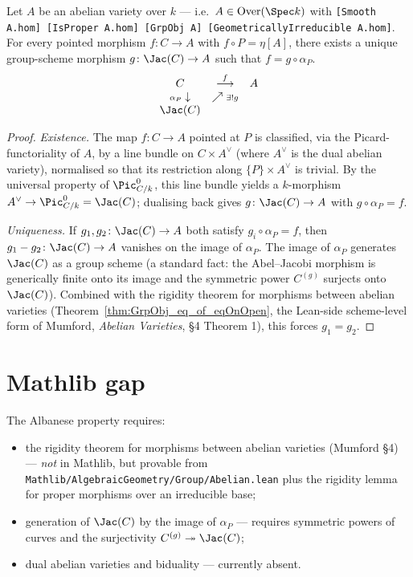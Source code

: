 \begin{theorem}
  \label{thm:exists_unique_ofCurve_comp}
  \leanok
  Let $A$ be an abelian variety over $k$ — i.e.\ $A \in \textrm{Over}(\Spec k)$ with \lstinline{[Smooth A.hom] [IsProper A.hom] [GrpObj A] [GeometricallyIrreducible A.hom]}. For every pointed morphism $f\colon C \to A$ with $f \circ P = \eta[A]$, there exists a unique group-scheme morphism $g\colon \Jac(C) \to A$ such that $f = g \circ \alpha_P$.
  \[
  \begin{array}{ccc}
    C & \stackrel{f}{\longrightarrow} & A \\
    {\scriptstyle\alpha_P} \downarrow & \nearrow {\scriptstyle\exists ! g} & \\
    \Jac(C) & &
  \end{array}
  \]
\end{theorem}

\begin{proof}
  \emph{Existence.} The map $f\colon C \to A$ pointed at $P$ is classified, via the Picard-functoriality of $A$, by a line bundle on $C \times A^\vee$ (where $A^\vee$ is the dual abelian variety), normalised so that its restriction along $\{P\}\times A^\vee$ is trivial. By the universal property of $\Pic^0_{C/k}$, this line bundle yields a $k$-morphism $A^\vee \to \Pic^0_{C/k} = \Jac(C)$; dualising back gives $g\colon \Jac(C) \to A$ with $g \circ \alpha_P = f$.

  \emph{Uniqueness.} If $g_1, g_2\colon \Jac(C) \to A$ both satisfy $g_i \circ \alpha_P = f$, then $g_1 - g_2\colon \Jac(C) \to A$ vanishes on the image of $\alpha_P$. The image of $\alpha_P$ generates $\Jac(C)$ as a group scheme (a standard fact: the Abel--Jacobi morphism is generically finite onto its image and the symmetric power $C^{(g)}$ surjects onto $\Jac(C)$). Combined with the rigidity theorem for morphisms between abelian varieties (Theorem~\ref{thm:GrpObj_eq_of_eqOnOpen}, the Lean-side scheme-level form of Mumford, \emph{Abelian Varieties}, §4 Theorem 1), this forces $g_1 = g_2$.
\end{proof}

\section{Mathlib gap}

The Albanese property requires:
\begin{itemize}
  \item the rigidity theorem for morphisms between abelian varieties (Mumford §4) — \emph{not} in Mathlib, but provable from \lstinline{Mathlib/AlgebraicGeometry/Group/Abelian.lean} plus the rigidity lemma for proper morphisms over an irreducible base;
  \item generation of $\Jac(C)$ by the image of $\alpha_P$ — requires symmetric powers of curves and the surjectivity $C^{(g)} \twoheadrightarrow \Jac(C)$;
  \item dual abelian varieties and biduality — currently absent.
\end{itemize}

